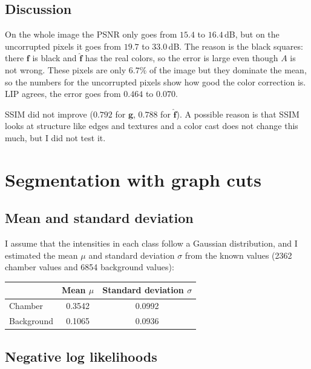 \documentclass[11pt,a4paper]{article}
\begin{document}
\subsection{Discussion}

On the whole image the PSNR only goes from $15.4$ to $16.4$\,dB, but on the uncorrupted pixels it goes from
$19.7$ to $33.0$\,dB. The reason is the black squares: there $\bm f$ is black and $\hat{\bm f}$ has the real
colors, so the error is large even though $A$ is not wrong. These pixels are only $6.7\%$ of the image but they
dominate the mean, so the numbers for the uncorrupted pixels show how good the color correction is.
LIP agrees, the error goes from $0.464$ to $0.070$.

SSIM did not improve ($0.792$ for $\bm g$, $0.788$ for $\hat{\bm f}$). A possible reason is that SSIM looks at
structure like edges and textures and a color cast does not change this much, but I did not test it.


\section{Segmentation with graph cuts}

\subsection{Mean and standard deviation}

I assume that the intensities in each class follow a Gaussian distribution, and I estimated the mean $\mu$
and standard deviation $\sigma$ from the known values (2362 chamber values and 6854 background values):

\begin{center}
\begin{tabular}{lcc}
 & Mean $\mu$ & Standard deviation $\sigma$ \\ \hline
 Chamber & 0.3542 & 0.0992 \\
 Background & 0.1065 & 0.0936 \\
\end{tabular}
\end{center}

\subsection{Negative log likelihoods}
\end{document}
